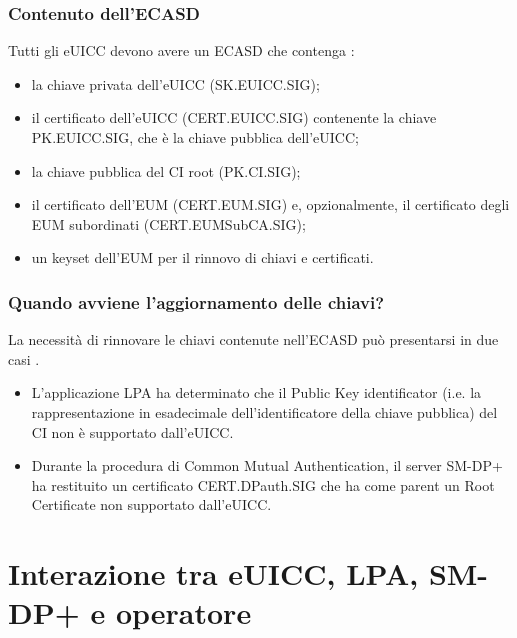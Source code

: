 \documentclass[10pt, oneside]{book}
\begin{document}
\subsubsection{Contenuto dell'ECASD}
Tutti gli eUICC devono avere un ECASD che contenga \cite{GSMA-docs-new}:
\begin{itemize}[itemsep=0pt]
\item la chiave privata dell'eUICC (SK.EUICC.SIG);
\item il certificato dell'eUICC (CERT.EUICC.SIG) contenente la chiave PK.EUICC.SIG, che è la chiave pubblica dell'eUICC;
\item la chiave pubblica del CI root (PK.CI.SIG);
\item il certificato dell'EUM (CERT.EUM.SIG) e, opzionalmente, il certificato degli EUM subordinati (CERT.EUMSubCA.SIG);
\item un keyset dell'EUM per il rinnovo di chiavi e certificati.
\end{itemize}

\subsubsection{Quando avviene l'aggiornamento delle chiavi?}
La necessità di rinnovare le chiavi contenute nell'ECASD può presentarsi in due casi \cite{GSMA-docs-new}.
\begin{itemize}
\item L'applicazione LPA ha determinato che il Public Key identificator (i.e. la rappresentazione in esadecimale dell'identificatore della chiave pubblica) del CI non è supportato dall'eUICC.
\item Durante la procedura di Common Mutual Authentication, il server SM-DP+ ha restituito un certificato CERT.DPauth.SIG che ha come parent un Root Certificate non supportato dall'eUICC.
\end{itemize}

\section{Interazione tra eUICC, LPA, SM-DP+ e operatore}
\end{document}
